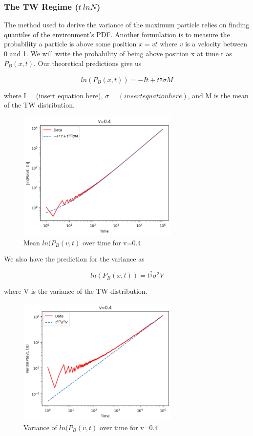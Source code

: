 \documentclass{article}
\begin{document}
\subsubsection{The TW Regime ($t~lnN$)}
\indent\indent The method used to derive the variance of the maximum particle relies on finding quantiles of the environment's PDF. Another formulation is to measure the probability a particle is above some position $x=vt$ where $v$ is a velocity between 0 and 1. We will write the probability of being above position x at time t as $P_{B}(x,t)$. Our theoretical predictions give us

\begin{equation}
ln(P_{B}(x, t)) = -It + t^{\frac{1}{3}}\sigma M
\end{equation}

where I = (insert equation here), $\sigma=(insert equation here)$, and M is the mean of the TW distribution.

\begin{figure}[H]
\centering
\includegraphics[width=8cm]{Mean0_4}
\caption{Mean $ln(P_{B}(v, t)$ over time for v=0.4}
\label{fig:MeanVelocity}
\end{figure}

We also have the prediction for the variance as

\begin{equation}
ln(P_{B}(x, t)) = t^{\frac{2}{3}}\sigma^{2}V
\end{equation}

where V is the variance of the TW distribution.

\begin{figure}[H]
\centering
\includegraphics[width=8cm]{Var0_4}
\caption{Variance of $ln(P_{B}(v, t)$ over time for v=0.4}
\label{fig:VarVelocity}
\end{figure}
\end{document}
